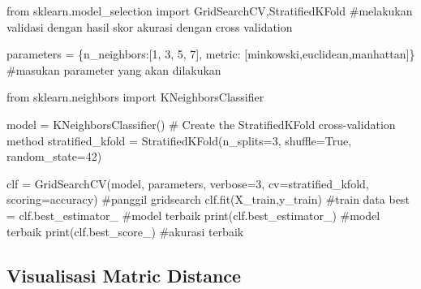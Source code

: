 \documentclass[
  letterpaper,
  DIV=11,
  numbers=noendperiod]{scrreprt}
\newenvironment{Shaded}{\begin{snugshade}}{\end{snugshade}}
\newcommand{\BuiltInTok}[1]{\textcolor[rgb]{0.00,0.23,0.31}{#1}}
\newcommand{\CommentTok}[1]{\textcolor[rgb]{0.37,0.37,0.37}{#1}}
\newcommand{\DecValTok}[1]{\textcolor[rgb]{0.68,0.00,0.00}{#1}}
\newcommand{\ImportTok}[1]{\textcolor[rgb]{0.00,0.46,0.62}{#1}}
\newcommand{\NormalTok}[1]{\textcolor[rgb]{0.00,0.23,0.31}{#1}}
\newcommand{\OperatorTok}[1]{\textcolor[rgb]{0.37,0.37,0.37}{#1}}
\newcommand{\StringTok}[1]{\textcolor[rgb]{0.13,0.47,0.30}{#1}}
\newcommand{\VariableTok}[1]{\textcolor[rgb]{0.07,0.07,0.07}{#1}}
\begin{document}
\begin{Shaded}
\begin{Highlighting}[]
\ImportTok{from}\NormalTok{ sklearn.model\_selection }\ImportTok{import}\NormalTok{ GridSearchCV,StratifiedKFold }\CommentTok{\#melakukan validasi dengan hasil skor akurasi dengan cross validation }

\NormalTok{parameters }\OperatorTok{=}\NormalTok{ \{}\StringTok{\textquotesingle{}n\_neighbors\textquotesingle{}}\NormalTok{:[}\DecValTok{1}\NormalTok{, }\DecValTok{3}\NormalTok{, }\DecValTok{5}\NormalTok{, }\DecValTok{7}\NormalTok{],}
             \StringTok{\textquotesingle{}metric\textquotesingle{}}\NormalTok{: [}\StringTok{\textquotesingle{}minkowski\textquotesingle{}}\NormalTok{,}\StringTok{\textquotesingle{}euclidean\textquotesingle{}}\NormalTok{,}\StringTok{\textquotesingle{}manhattan\textquotesingle{}}\NormalTok{]\} }\CommentTok{\#masukan parameter yang akan dilakukan }

\ImportTok{from}\NormalTok{ sklearn.neighbors }\ImportTok{import}\NormalTok{ KNeighborsClassifier }

\NormalTok{model }\OperatorTok{=}\NormalTok{ KNeighborsClassifier()}
\CommentTok{\# Create the StratifiedKFold cross{-}validation method}
\NormalTok{stratified\_kfold }\OperatorTok{=}\NormalTok{ StratifiedKFold(n\_splits}\OperatorTok{=}\DecValTok{3}\NormalTok{, shuffle}\OperatorTok{=}\VariableTok{True}\NormalTok{, random\_state}\OperatorTok{=}\DecValTok{42}\NormalTok{)}


\NormalTok{clf }\OperatorTok{=}\NormalTok{ GridSearchCV(model, parameters, verbose}\OperatorTok{=}\DecValTok{3}\NormalTok{, cv}\OperatorTok{=}\NormalTok{stratified\_kfold, scoring}\OperatorTok{=}\StringTok{\textquotesingle{}accuracy\textquotesingle{}}\NormalTok{) }\CommentTok{\#panggil gridsearch}
\NormalTok{clf.fit(X\_train,y\_train) }\CommentTok{\#train data}
\NormalTok{best }\OperatorTok{=}\NormalTok{ clf.best\_estimator\_ }\CommentTok{\#model terbaik}
\BuiltInTok{print}\NormalTok{(clf.best\_estimator\_) }\CommentTok{\#model terbaik}
\BuiltInTok{print}\NormalTok{(clf.best\_score\_) }\CommentTok{\#akurasi terbaik}
\end{Highlighting}
\end{Shaded}

\hypertarget{visualisasi-matric-distance-1}{%
\subsection*{Visualisasi Matric
Distance}\label{visualisasi-matric-distance-1}}
\end{document}
